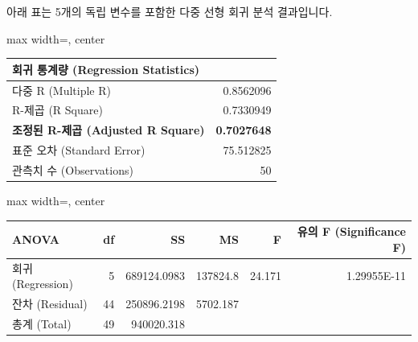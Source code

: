 \documentclass[11pt,a4paper]{book}
\theoremstyle{definition}
\begin{document}
\begin{tcolorbox}[title={\textbf{Excel 출력: 다중 선형 회귀 분석 (초기 모델)}}]
아래 표는 5개의 독립 변수를 포함한 다중 선형 회귀 분석 결과입니다.

\begin{adjustbox}{max width=\textwidth, center}
\begin{tabular}{l r}
\toprule
\textbf{회귀 통계량 (Regression Statistics)} & \\
\midrule
다중 R (Multiple R) & 0.8562096 \\
R-제곱 (R Square) & 0.7330949 \\
\textbf{조정된 R-제곱 (Adjusted R Square)} & \textbf{0.7027648} \\
표준 오차 (Standard Error) & 75.512825 \\
관측치 수 (Observations) & 50 \\
\bottomrule
\end{tabular}
\end{adjustbox}

\vspace{0.5em}

\begin{adjustbox}{max width=\textwidth, center}
\begin{tabular}{l r r r r r}
\toprule
\textbf{ANOVA} & \textbf{df} & \textbf{SS} & \textbf{MS} & \textbf{F} & \textbf{유의 F (Significance F)} \\
\midrule
회귀 (Regression) & 5 & 689124.0983 & 137824.8 & 24.171 & 1.29955E-11 \\
잔차 (Residual) & 44 & 250896.2198 & 5702.187 & & \\
총계 (Total) & 49 & 940020.318 & & & \\
\bottomrule
\end{tabular}
\end{adjustbox}

\vspace{0.5em}


\end{tcolorbox}
\end{document}
